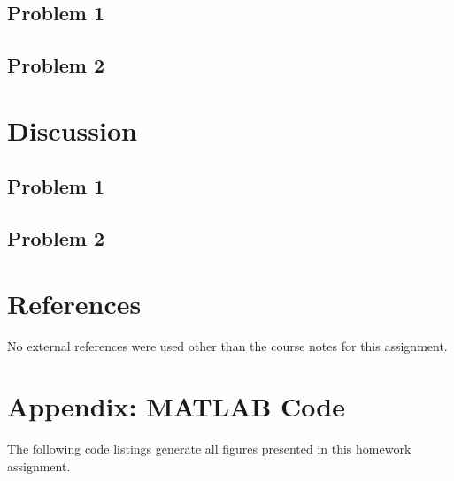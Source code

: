 \documentclass[12pt]{article}
\begin{document}
\subsection{Problem 1}

\subsection{Problem 2}

\section{Discussion} %

\subsection{Problem 1}

\subsection{Problem 2}

\section{References} %

No external references were used other than the course notes for this assignment.

\section*{Appendix: MATLAB Code} %

The following code listings generate all figures presented in this homework assignment.


\end{document}
